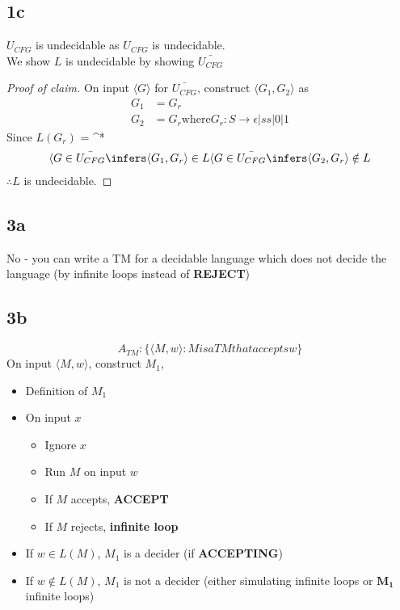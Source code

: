 \documentclass{article}
\def\rarr{\rightarrow}
\newcommand{\mb}[1]{\mathbf{#1}}
\newcommand{\tb}[1]{\textbf{#1}}
\theoremstyle{definition}
\theoremstyle{remark}
\begin{document}
\subsection{1c}
$U_{CFG}$ is undecidable as $U_{CFG}$ is undecidable. \\ 
We show $L$ is undecidable by showing $\bar{U_{CFG}}$
\begin{proof}[Proof of claim]
    On input $\langle G \rangle$ for $\bar{U_{CFG}}$, construct $\langle G_1, G_2 \rangle$ as
    \begin{align*}
        G_1 &= G_r \\
        G_2 &= G_r \text{where} G_r: S \rarr \epsilon|ss|0|1
    \end{align*}
    Since $L(G_r)$ = \Sigma^*
    \begin{align*}
        \langle G \in \bar{U_{CFG}} \infers \langle G_1, G_r \rangle \in L
        \langle G \in \bar{U_{CFG}} \infers \langle G_2, G_r \rangle \notin L
    \end{align*}
    $\therefore L$ is undecidable.
\end{proof}

\subsection{3a}
No - you can write a TM for a decidable language which does not decide the language (by infinite loops instead of \tb{REJECT})

\subsection{3b}
\[
    A_{TM} : \{\langle M, w \rangle : M is a TM that accepts w \}
\]
On input $\langle M, w \rangle$, construct $M_1$,
\begin{itemize}
    \item Definition of $M_1$
    \item On input $x$
    \begin{itemize}
        \item Ignore $x$
        \item Run $M$ on input $w$
        \item If $M$ accepts, \tb{ACCEPT}
        \item If $M$ rejects, \tb{infinite loop}
    \end{itemize}
    \item If $w \in L(M)$, $M_1$ is a decider (if \tb{ACCEPTING})
    \item If $w \notin L(M)$, $M_1$ is not a decider (either simulating infinite loops or $\mb{M_1}$ infinite loops)
\end{itemize} 
\end{document}
